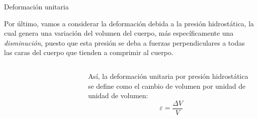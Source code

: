 \documentclass[11pt,handout,aspectratio=1610]{beamer}
\begin{document}
\begin{frame}{Deformación unitaria}

    Por último, vamos a considerar la deformación debida a la presión hidrostática, la cual genera una variación del volumen del cuerpo, más específicamente una \emph{disminución}, puesto que esta presión se deba a fuerzas perpendiculares a todas las caras del cuerpo que tienden a comprimir al cuerpo.

    \begin{columns}
        \begin{column}{0.5\textwidth}
            \begin{figure}
                \centering
                \begin{subfigure}{\textwidth}
                    \centering
                    \includegraphics{../figs/fluid_dynamics_pressure-2.pdf}
                \end{subfigure}
            \end{figure}
        \end{column}
        \begin{column}{0.5\textwidth}
            Así, la deformación unitaria por presión hidrostática se define como el cambio de volumen por unidad de unidad de volumen: $$ \varepsilon = \frac{\Delta V}{V} $$
        \end{column}
    \end{columns}

\end{frame}
\end{document}
